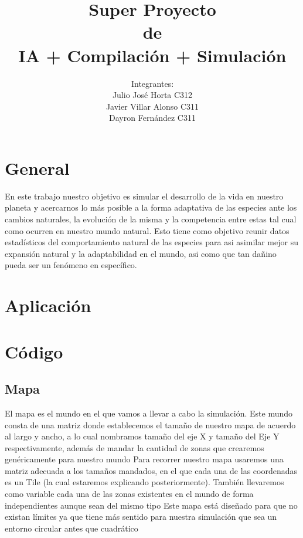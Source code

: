\documentclass{llncs}
\title{\large\huge Super Proyecto\\de \\ IA + Compilación + Simulación}
\author{Integrantes: \\ Julio José Horta C312 \\Javier Villar Alonso C311 \\ Dayron Fernández C311}
\begin{document}
	
\maketitle

\newpage

\section{General}
En este trabajo nuestro objetivo es simular el desarrollo de la vida en nuestro planeta y acercarnos lo más posible a la forma adaptativa de las especies ante los cambios naturales, la evolución de la misma y la competencia entre estas tal cual como ocurren en nuestro mundo natural.
\newline
\newline
Esto tiene como objetivo reunir datos estadísticos del comportamiento natural de las especies para asi asimilar mejor su expansión natural y la adaptabilidad en el mundo, asi como que tan dañino pueda ser un fenómeno en específico. 


\section{Aplicación}

\section{Código}

\subsection{Mapa}
El mapa es el mundo en el que vamos a llevar a cabo la simulación. Este mundo consta de una matriz donde establecemos el tamaño de nuestro mapa de acuerdo al largo y ancho, a lo cual nombramos tamaño del eje X y tamaño del Eje Y respectivamente, además de mandar la cantidad de zonas que crearemos genéricamente para nuestro mundo
\newline
\newline
Para recorrer nuestro mapa usaremos una matriz adecuada a los tamaños mandados, en el que cada una de las coordenadas es un Tile (la cual estaremos explicando posteriormente). También llevaremos como variable cada una de las zonas existentes en el mundo de forma independientes aunque sean del mismo tipo
\newline
\newline
Este mapa está diseñado para que no existan límites ya que tiene más sentido para nuestra simulación que sea un entorno circular antes que cuadrático
\end{document}
